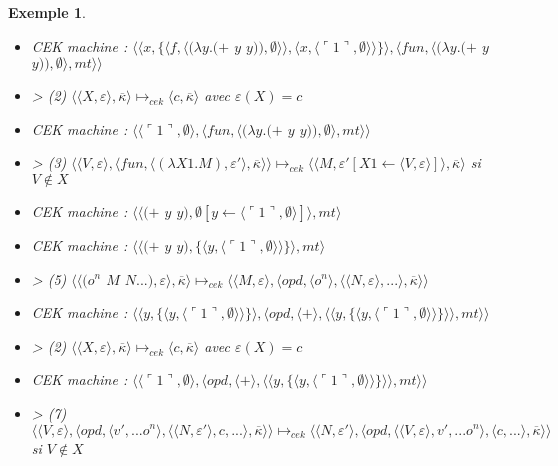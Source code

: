 \documentclass[10pt,a4paper]{report}
\newtheorem{ex}{Exemple}
\begin{document}
\begin{ex}
\begin{itemize}
			\item[] CEK machine : $\langle\langle x,\{\langle f,\langle(\lambda y.(+$ $y$ $y)),\emptyset\rangle\rangle,\langle x,\langle\ulcorner 1\urcorner,\emptyset\rangle\rangle\}\rangle,\langle fun,\langle(\lambda y.(+$ $y$ $y)),\emptyset\rangle,mt\rangle\rangle$	
			\item[] > (2) $\langle\langle X,\varepsilon\rangle,\overline{\kappa}\rangle \longmapsto_{cek} \langle c,\overline{\kappa}\rangle$ avec $\varepsilon(X) = c$
			\item[] CEK machine : $\langle \langle\ulcorner 1\urcorner,\emptyset\rangle,\langle fun,\langle(\lambda y.(+$ $y$ $y)),\emptyset\rangle,mt\rangle\rangle$	
			\item[] > (3) $\langle\langle V,\varepsilon\rangle,\langle fun,\langle (\lambda X1.M),\varepsilon'\rangle,\overline{\kappa} \rangle \rangle \longmapsto_{cek} \langle \langle M,\varepsilon'[X1 \leftarrow \langle V,\varepsilon\rangle]\rangle,\overline{\kappa}\rangle$ si $V \notin X$
			\item[] CEK machine : $\langle\langle(+$ $y$ $y),\emptyset[y \leftarrow\langle\ulcorner 1\urcorner,\emptyset\rangle]\rangle ,mt\rangle$
			\item[] CEK machine : $\langle\langle(+$ $y$ $y),\{\langle y,\langle\ulcorner 1\urcorner,\emptyset\rangle\rangle\}\rangle ,mt\rangle$
			\item[] > (5) $\langle\langle(o^{n}$ $M$ $N...),\varepsilon\rangle,\overline{\kappa}\rangle \longmapsto_{cek} \langle \langle M,\varepsilon\rangle,\langle opd,\langle o^{n}\rangle,\langle \langle N,\varepsilon\rangle,...\rangle,\overline{\kappa}\rangle\rangle$
			\item[] CEK machine : $\langle\langle y,\{\langle y,\langle\ulcorner 1\urcorner,\emptyset\rangle\rangle\}\rangle ,\langle opd,\langle+\rangle,\langle\langle y,\{\langle y,\langle\ulcorner 1\urcorner,\emptyset\rangle\rangle\}\rangle\rangle,mt\rangle\rangle$
			\item[] > (2) $\langle\langle X,\varepsilon\rangle,\overline{\kappa}\rangle \longmapsto_{cek} \langle c,\overline{\kappa}\rangle$ avec $\varepsilon(X) = c$
			\item[] CEK machine : $\langle\langle\ulcorner 1\urcorner,\emptyset\rangle,\langle opd,\langle+\rangle,\langle\langle y,\{\langle y,\langle\ulcorner 1\urcorner,\emptyset\rangle\rangle\}\rangle\rangle,mt\rangle\rangle$
			\item[] > (7) $\langle \langle V,\varepsilon\rangle,\langle opd,\langle v',...o^{n}\rangle,\langle  \langle N,\varepsilon'\rangle,c,...\rangle,\overline{\kappa}\rangle\rangle \longmapsto_{cek} \langle \langle N,\varepsilon'\rangle,\langle opd,\langle  \langle V,\varepsilon\rangle,v',...o^{n}\rangle,\langle c,...\rangle,\overline{\kappa}\rangle\rangle$ si $V \notin X$

\end{itemize}
\end{ex}
\end{document}
